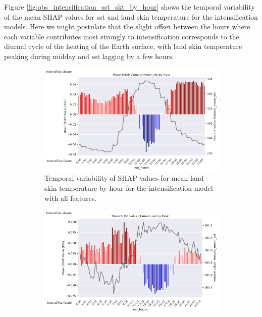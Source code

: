 Figure \ref{fig:obs_intensification_sst_skt_by_hour} shows the temporal variability of the mean SHAP values for \acrfull{sst} and land skin temperature for the intensification models. Here we might postulate that the slight offset between the hours where each variable contributes most strongly to intensification corresponds to the diurnal cycle of the heating of the Earth surface, with land skin temperature peaking during midday and \acrshort{sst} lagging by a few hours.

\begin{figure}[ht]
    \centering
    \begin{subfigure}[t]{\textwidth}
        \centering
        \includegraphics[width=\textwidth]{../figures/generated/experiments/obs_intensification/temporal_corr/obs_intensification_all_shap_mean_skt_by_hour.png}
        \caption{Temporal variability of SHAP values for mean land skin temperature by hour for the intensification model with all features.}
        \label{fig:obs_intensification_all_shap_mean_skt_by_hour}
    \end{subfigure}
    \vspace{1em}
    \begin{subfigure}[t]{\textwidth}
        \centering
        \includegraphics[width=\textwidth]{../figures/generated/experiments/obs_intensification/temporal_corr/obs_intensification_era5_shap_mean_sst_by_hour.png}

\end{subfigure}
\end{figure}
